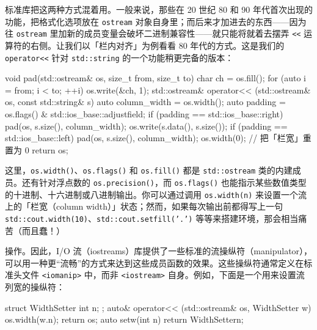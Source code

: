 标准库把这两种方式混着用。一般来说，那些在 20 世纪 80 和 90 年代首次出现的功能，把格式化选项放在 \texttt{ostream} 对象自身里；而后来才加进去的东西——因为往 \texttt{ostream} 里加新的成员变量会破坏二进制兼容性——就只能将就着去摆弄 \texttt{<<} 运算符的右侧。让我们以「栏内对齐」为例看看 80 年代的方式。这是我们的 \texttt{operator<<} 针对 \texttt{std::\allowbreak{}string} 的一个功能稍更完备的版本：

\begin{codebox}[cpp]
    void pad(std::ostream& os, size_t from, size_t to)
    {
      char ch = os.fill();
      for (auto i = from; i < to; ++i) {
        os.write(&ch, 1);
      }
    }
    std::ostream& operator<< (std::ostream& os, const std::string& s)
    {
      auto column_width = os.width();
      auto padding = os.flags() & std::ios_base::adjustfield;
      if (padding == std::ios_base::right) {
        pad(os, s.size(), column_width);
      }
      os.write(s.data(), s.size());
      if (padding == std::ios_base::left) {
        pad(os, s.size(), column_width);
      }
      os.width(0); // 把「栏宽」重置为 0
      return os;
    }
\end{codebox}

这里，\texttt{os.\allowbreak{}width(\allowbreak{})\allowbreak{}}、\texttt{os.\allowbreak{}flags(\allowbreak{})\allowbreak{}} 和 \texttt{os.\allowbreak{}fill(\allowbreak{})\allowbreak{}} 都是 \texttt{std::\allowbreak{}ostream} 类的内建成员。还有针对浮点数的 \texttt{os.\allowbreak{}precision(\allowbreak{})\allowbreak{}}，而 \texttt{os.\allowbreak{}flags(\allowbreak{})\allowbreak{}} 也能指示某些数值类型的十进制、十六进制或八进制输出。你可以通过调用 \texttt{os.\allowbreak{}width(\allowbreak{}n)\allowbreak{}} 来设置一个流上的「栏宽（column width）」状态；然而，如果每次输出前都得写上一句 \texttt{std::\allowbreak{}cout.\allowbreak{}width(\allowbreak{}10)\allowbreak{}}、\texttt{std::\allowbreak{}cout.\allowbreak{}setfill(\allowbreak{}'.')\allowbreak{}} 等等来搭建环境，那会相当痛苦（而且蠢！）

操作。因此，I/O 流（iostreams）库提供了一些标准的流操纵符（manipulator），可以用一种更“流畅”的方式来达到这些成员函数的效果。这些操纵符通常定义在标准头文件 \texttt{<iomanip>\allowbreak{}} 中，而非 \texttt{<iostream>\allowbreak{}} 自身。例如，下面是一个用来设置流列宽的操纵符：

\begin{codebox}[cpp]
    struct WidthSetter { int n; };
    auto& operator<< (std::ostream& os, WidthSetter w)
    {
      os.width(w.n);
      return os;
    }
    auto setw(int n) { return WidthSetter{n}; }
\end{codebox}

